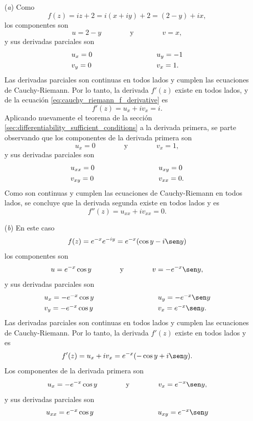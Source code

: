 \documentclass[a4paper]{report}
\begin{document}
\begin{enumerate}
 \item[(\textit{a})] Como
 \[
  f(z)=iz+2=i(x+iy)+2=(2-y)+ix,
 \]
 los componentes son 
 \[
  u=2-y
  \qquad\qquad\textrm{y}\qquad\qquad
  v=x,
 \]
 y sus derivadas parciales son 
 \[
 \begin{array}{ll}
  u_x=0\qquad\qquad\qquad\qquad&u_y=-1\\[\smallskipamount]
  v_y=0\qquad\qquad\qquad\qquad&v_x=1.
 \end{array}
 \]
 Las derivadas parciales son continuas en todos lados y cumplen las ecuaciones de Cauchy-Riemann. Por lo tanto, la derivada \(f'(z)\) existe en todos lados, y de la ecuación \ref{eq:cauchy_riemann_f_derivative} es
 \[
  f'(z)=u_x+iv_x=i.
 \]
 Aplicando nuevamente el teorema de la sección \ref{sec:differentiability_sufficient_conditions} a la derivada primera, se parte observando que los componentes de la derivada primera son
 \[
  u_x=0
  \qquad\qquad\textrm{y}\qquad\qquad
  v_x=1,
 \]
 y sus derivadas parciales son
 \[
 \begin{array}{ll}
  u_{xx}=0\qquad\qquad\qquad\qquad&u_{xy}=0\\[\smallskipamount]
  v_{xy}=0\qquad\qquad\qquad\qquad&v_{xx}=0.
 \end{array}
 \]
 Como son continuas y cumplen las ecuaciones de Cauchy-Riemann en todos lados, se concluye que la derivada segunda existe en todos lados y es
 \[
  f''(z)=u_{xx}+iv_{xx}=0.
 \]
 \item[(\textit{b})] En este caso
 \[
  f(z)=e^{-x}e^{-iy}=e^{-x}(\cos y-i\sen y)
 \]
 los componentes son 
 \[
  u=e^{-x}\cos y
  \qquad\qquad\textrm{y}\qquad\qquad
  v=-e^{-x}\sen y,
 \]
 y sus derivadas parciales son 
 \[
 \begin{array}{ll}
  u_x=-e^{-x}\cos y\qquad\qquad\qquad\qquad&u_y=-e^{-x}\sen y\\[\smallskipamount]
  v_y=-e^{-x}\cos y\qquad\qquad\qquad\qquad&v_x=e^{-x}\sen y.
 \end{array}
 \]
 Las derivadas parciales son continuas en todos lados y cumplen las ecuaciones de Cauchy-Riemann. Por lo tanto, la derivada \(f'(z)\) existe en todos lados y es
 \[
  f'(z)=u_x+iv_x=e^{-x}(-\cos y+i\sen y).
 \]
 Los componentes de la derivada primera son
 \[
  u_x=-e^{-x}\cos y
  \qquad\qquad\textrm{y}\qquad\qquad
  v_x=e^{-x}\sen y,
 \]
 y sus derivadas parciales son 
 \[
 \begin{array}{ll}
  u_{xx}=e^{-x}\cos y\qquad\qquad\qquad\qquad&u_{xy}=e^{-x}\sen y\\[\smallskipamount]

\end{array}\]
\end{enumerate}
\end{document}
